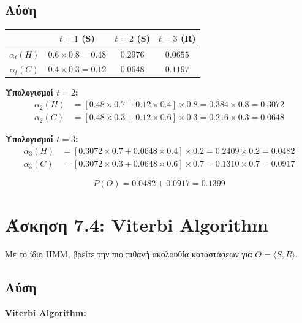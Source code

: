 \subsection*{Λύση}

\begin{center}
\begin{tabular}{c|ccc}
\toprule
 & $t=1$ (S) & $t=2$ (S) & $t=3$ (R) \\
\midrule
$\alpha_t(H)$ & $0.6 \times 0.8 = 0.48$ & $0.2976$ & $0.0655$ \\
$\alpha_t(C)$ & $0.4 \times 0.3 = 0.12$ & $0.0648$ & $0.1197$ \\
\bottomrule
\end{tabular}
\end{center}

\textbf{Υπολογισμοί $t=2$:}
\begin{align*}
\alpha_2(H) &= [0.48 \times 0.7 + 0.12 \times 0.4] \times 0.8 = 0.384 \times 0.8 = 0.3072 \\
\alpha_2(C) &= [0.48 \times 0.3 + 0.12 \times 0.6] \times 0.3 = 0.216 \times 0.3 = 0.0648
\end{align*}

\textbf{Υπολογισμοί $t=3$:}
\begin{align*}
\alpha_3(H) &= [0.3072 \times 0.7 + 0.0648 \times 0.4] \times 0.2 = 0.2409 \times 0.2 = 0.0482 \\
\alpha_3(C) &= [0.3072 \times 0.3 + 0.0648 \times 0.6] \times 0.7 = 0.1310 \times 0.7 = 0.0917
\end{align*}

$$P(O) = 0.0482 + 0.0917 = 0.1399$$

\section{Άσκηση 7.4: Viterbi Algorithm}

\begin{formulabox}[Εκφώνηση]
Με το ίδιο HMM, βρείτε την πιο πιθανή ακολουθία καταστάσεων για $O = \langle S, R \rangle$.
\end{formulabox}

\subsection*{Λύση}

\textbf{Viterbi Algorithm:}

